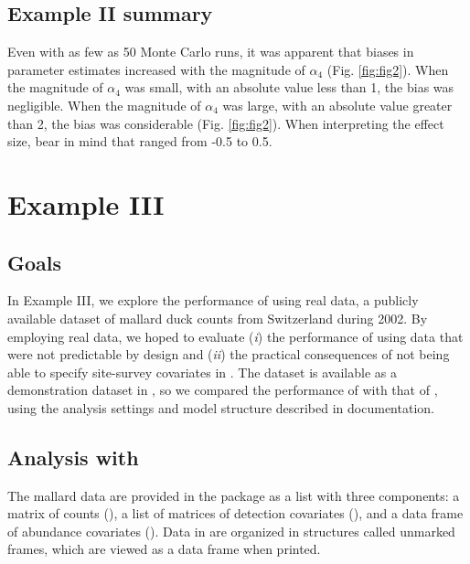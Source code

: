 \documentclass[codesnippet]{jss}
\begin{document}
\subsection[Example II summary]{Example II summary}
Even with as few as 50 Monte Carlo runs, it was apparent that biases in parameter estimates increased with the magnitude of $\alpha_4$ (Fig. \ref{fig:fig2}). When the magnitude of $\alpha_4$ was small, with an absolute value less than 1, the bias was negligible. When the magnitude of $\alpha_4$ was large, with an absolute value greater than 2, the bias was considerable (Fig. \ref{fig:fig2}). When interpreting the effect size, bear in mind that  ranged from -0.5 to 0.5.

\section[Example III]{Example III}
\subsection[Goals]{Goals}
In Example III, we explore the performance of  using real data, 
a publicly available dataset of mallard duck counts from Switzerland during 
2002. By employing real data, we hoped to evaluate (\textit{i}) the 
performance of  using data that were not predictable by design 
and (\textit{ii}) the practical consequences of not being able to specify 
site-survey covariates in . The dataset is available as a 
demonstration dataset in , so we compared the performance of 
 with that of , using the analysis settings and 
model structure described in  documentation.

\subsection[Analysis with R-INLA]{Analysis with }
The mallard data are provided in the  package as a list with 
three components: a matrix of counts (), a list of matrices 
of detection covariates (), and a data frame of abundance 
covariates (). Data in  are organized in 
structures called unmarked frames, which are viewed as a data frame when 
printed.
\end{document}

